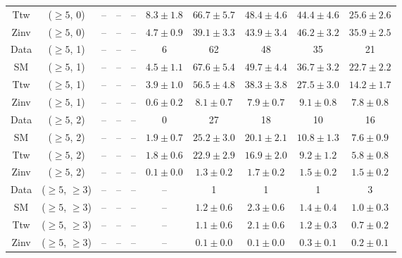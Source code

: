 \begin{table}[h!]
{\begin{tabular}{cccccccccc}
	Ttw & ($\ge5$, 0) & -- & -- & -- & $8.3\pm 1.8$ & $66.7\pm 5.7$ & $48.4\pm 4.6$ & $44.4\pm 4.6$ & $25.6\pm 2.6$ \\[0.5ex] 
	Zinv & ($\ge5$, 0) & -- & -- & -- & $4.7\pm 0.9$ & $39.1\pm 3.3$ & $43.9\pm 3.4$ & $46.2\pm 3.2$ & $35.9\pm 2.5$ \\[0.5ex] 
	Data & ($\ge5$, 1) & -- & -- & -- & 6 & 62 & 48 & 35 & 21 \\[0.5ex] 
	SM & ($\ge5$, 1) & -- & -- & -- & $4.5\pm 1.1$ & $67.6\pm 5.4$ & $49.7\pm 4.4$ & $36.7\pm 3.2$ & $22.7\pm 2.2$ \\[0.5ex] 
	Ttw & ($\ge5$, 1) & -- & -- & -- & $3.9\pm 1.0$ & $56.5\pm 4.8$ & $38.3\pm 3.8$ & $27.5\pm 3.0$ & $14.2\pm 1.7$ \\[0.5ex] 
	Zinv & ($\ge5$, 1) & -- & -- & -- & $0.6\pm 0.2$ & $8.1\pm 0.7$ & $7.9\pm 0.7$ & $9.1\pm 0.8$ & $7.8\pm 0.8$ \\[0.5ex] 
	Data & ($\ge5$, 2) & -- & -- & -- & 0 & 27 & 18 & 10 & 16 \\[0.5ex] 
	SM & ($\ge5$, 2) & -- & -- & -- & $1.9\pm 0.7$ & $25.2\pm 3.0$ & $20.1\pm 2.1$ & $10.8\pm 1.3$ & $7.6\pm 0.9$ \\[0.5ex] 
	Ttw & ($\ge5$, 2) & -- & -- & -- & $1.8\pm 0.6$ & $22.9\pm 2.9$ & $16.9\pm 2.0$ & $9.2\pm 1.2$ & $5.8\pm 0.8$ \\[0.5ex] 
	Zinv & ($\ge5$, 2) & -- & -- & -- & $0.1\pm 0.0$ & $1.3\pm 0.2$ & $1.7\pm 0.2$ & $1.5\pm 0.2$ & $1.5\pm 0.2$ \\[0.5ex] 
	Data & ($\ge5$, $\ge3$) & -- & -- & -- & -- & 1 & 1 & 1 & 3 \\[0.5ex] 
	SM & ($\ge5$, $\ge3$) & -- & -- & -- & -- & $1.2\pm 0.6$ & $2.3\pm 0.6$ & $1.4\pm 0.4$ & $1.0\pm 0.3$ \\[0.5ex] 
	Ttw & ($\ge5$, $\ge3$) & -- & -- & -- & -- & $1.1\pm 0.6$ & $2.1\pm 0.6$ & $1.2\pm 0.3$ & $0.7\pm 0.2$ \\[0.5ex] 
	Zinv & ($\ge5$, $\ge3$) & -- & -- & -- & -- & $0.1\pm 0.0$ & $0.1\pm 0.0$ & $0.3\pm 0.1$ & $0.2\pm 0.1$ \\[0.5ex] 
	\hline
	\hline
\end{tabular}}
\end{table}

